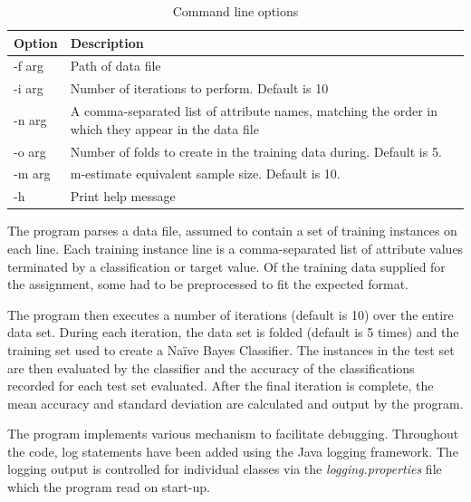 \documentclass[10pt]{report}
\begin{document}
\begin{table}[h]
  \centering
  \begin{tabular}{ |l|p{10cm}|} 
    \hline
    Option & Description \\ \hline
    -f \<arg\>  &  Path of data file \\ \hline
    -i \<arg\>  &  Number of iterations to perform. Default is 10 \\ \hline
    -n \<arg\>  &  A comma-separated list of attribute names, matching
    the order in which they appear in the data file \\ \hline
    -o \<arg\>  &  Number of folds to create in the training data
    during. Default is 5. \\ \hline
    -m \<arg\>  &  m-estimate equivalent sample size. Default is 10. \\ \hline
    -h          &  Print help message \\ \hline
  \end{tabular}
  \caption{Command line options}
  \label{tab:commandline}
\end{table}

The program parses a data file, assumed to contain a set of training
instances on each line. Each training instance line is a
comma-separated list of attribute values terminated by a
classification or target value. Of the training data supplied for the
assignment, some had to be preprocessed to fit the expected format.

The program then executes a number of iterations (default is 10) over
the entire data set. During each iteration, the data set is folded
(default is 5 times) and the training set used to create a Na\"{i}ve
  Bayes Classifier. The instances in the test set are then evaluated 
  by the classifier and the accuracy of the classifications 
  recorded for each test set evaluated. After the final iteration is
  complete, the mean accuracy and standard deviation are calculated
  and output by the program.

The program implements various mechanism to facilitate
debugging. Throughout the code, log statements have been added using
the Java logging framework. The logging output is controlled for
individual classes via the \textit{logging.properties} file which the program
read on start-up.
\end{document}
